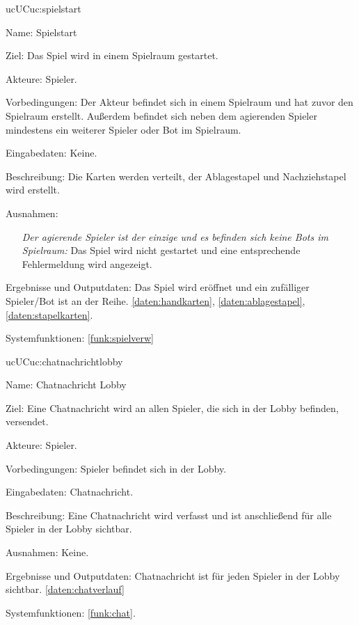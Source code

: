 \begin{description}[leftmargin=5em, style=sameline]
	\begin{lhp}{uc}{UC}{uc:spielstart}
		\item [Name:]Spielstart
		\item [Ziel:]Das Spiel wird in einem Spielraum gestartet.
		\item [Akteure:]Spieler.
		\item [Vorbedingungen:]Der Akteur befindet sich in einem Spielraum und hat zuvor den Spielraum erstellt. Außerdem befindet sich neben dem agierenden Spieler mindestens ein weiterer Spieler oder Bot im Spielraum.
		\item [Eingabedaten:]Keine.
		\item [Beschreibung:]Die Karten werden verteilt, der Ablagestapel und Nachziehstapel wird erstellt. 
		\item [Ausnahmen:] \hfill
		\begin{itemize}
		    \item []
		    \textit{Der agierende Spieler ist der einzige und es befinden sich keine Bots im Spielraum: } Das Spiel wird nicht gestartet und eine entsprechende Fehlermeldung wird angezeigt.
		\end{itemize}
		\item [Ergebnisse und Outputdaten:]Das Spiel wird eröffnet und ein zufälliger Spieler/Bot ist an der Reihe. \ref{daten:handkarten},
		\ref{daten:ablagestapel},
		\ref{daten:stapelkarten}.
		\item [Systemfunktionen:]
		\ref{funk:spielverw}
	\end{lhp}
	
		\begin{lhp}{uc}{UC}{uc:chatnachrichtlobby}
		\item [Name:]Chatnachricht Lobby
		\item [Ziel:]Eine Chatnachricht wird an allen Spieler, die sich in der Lobby befinden, versendet.
		\item [Akteure:]Spieler. 
		\item [Vorbedingungen:]Spieler befindet sich in der Lobby.
		\item [Eingabedaten:]Chatnachricht.
		\item [Beschreibung:] Eine Chatnachricht wird verfasst und ist anschließend für alle Spieler in der Lobby sichtbar.
		\item [Ausnahmen:]Keine.
		\item [Ergebnisse und Outputdaten:] Chatnachricht ist für jeden Spieler in der Lobby sichtbar. \ref{daten:chatverlauf}
		\item [Systemfunktionen:]  \ref{funk:chat}.
	\end{lhp}
	

\end{description}
